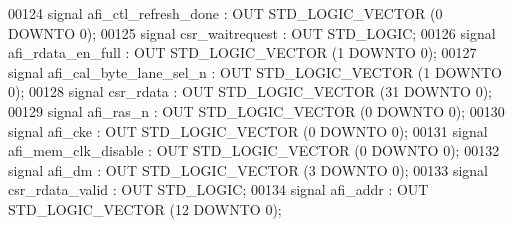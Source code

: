 \begin{DoxyCode}
00124         \textcolor{keywordflow}{signal} afi\_ctl\_refresh\_done : \textcolor{keywordflow}{OUT} \textcolor{comment}{STD\_LOGIC\_VECTOR} (\textcolor{vhdllogic}{}\textcolor{vhdllogic}{0} \textcolor{keywordflow}{DOWNTO} \textcolor{vhdllogic}{}\textcolor{vhdllogic}{0});
00125         \textcolor{keywordflow}{signal} csr\_waitrequest : \textcolor{keywordflow}{OUT} \textcolor{comment}{STD\_LOGIC};
00126         \textcolor{keywordflow}{signal} afi\_rdata\_en\_full : \textcolor{keywordflow}{OUT} \textcolor{comment}{STD\_LOGIC\_VECTOR} (\textcolor{vhdllogic}{}\textcolor{vhdllogic}{1} \textcolor{keywordflow}{DOWNTO} \textcolor{vhdllogic}{}\textcolor{vhdllogic}{0});
00127         \textcolor{keywordflow}{signal} afi\_cal\_byte\_lane\_sel\_n : \textcolor{keywordflow}{OUT} \textcolor{comment}{STD\_LOGIC\_VECTOR} (\textcolor{vhdllogic}{}\textcolor{vhdllogic}{1} \textcolor{keywordflow}{DOWNTO} \textcolor{vhdllogic}{}\textcolor{vhdllogic}{0});
00128         \textcolor{keywordflow}{signal} csr\_rdata : \textcolor{keywordflow}{OUT} \textcolor{comment}{STD\_LOGIC\_VECTOR} (\textcolor{vhdllogic}{}\textcolor{vhdllogic}{31} \textcolor{keywordflow}{DOWNTO} \textcolor{vhdllogic}{}\textcolor{vhdllogic}{0});
00129         \textcolor{keywordflow}{signal} afi\_ras\_n : \textcolor{keywordflow}{OUT} \textcolor{comment}{STD\_LOGIC\_VECTOR} (\textcolor{vhdllogic}{}\textcolor{vhdllogic}{0} \textcolor{keywordflow}{DOWNTO} \textcolor{vhdllogic}{}\textcolor{vhdllogic}{0});
00130         \textcolor{keywordflow}{signal} afi\_cke : \textcolor{keywordflow}{OUT} \textcolor{comment}{STD\_LOGIC\_VECTOR} (\textcolor{vhdllogic}{}\textcolor{vhdllogic}{0} \textcolor{keywordflow}{DOWNTO} \textcolor{vhdllogic}{}\textcolor{vhdllogic}{0});
00131         \textcolor{keywordflow}{signal} afi\_mem\_clk\_disable : \textcolor{keywordflow}{OUT} \textcolor{comment}{STD\_LOGIC\_VECTOR} (\textcolor{vhdllogic}{}\textcolor{vhdllogic}{0} \textcolor{keywordflow}{DOWNTO} \textcolor{vhdllogic}{}\textcolor{vhdllogic}{0});
00132         \textcolor{keywordflow}{signal} afi\_dm : \textcolor{keywordflow}{OUT} \textcolor{comment}{STD\_LOGIC\_VECTOR} (\textcolor{vhdllogic}{}\textcolor{vhdllogic}{3} \textcolor{keywordflow}{DOWNTO} \textcolor{vhdllogic}{}\textcolor{vhdllogic}{0});
00133         \textcolor{keywordflow}{signal} csr\_rdata\_valid : \textcolor{keywordflow}{OUT} \textcolor{comment}{STD\_LOGIC};
00134         \textcolor{keywordflow}{signal} afi\_addr : \textcolor{keywordflow}{OUT} \textcolor{comment}{STD\_LOGIC\_VECTOR} (\textcolor{vhdllogic}{}\textcolor{vhdllogic}{12} \textcolor{keywordflow}{DOWNTO} \textcolor{vhdllogic}{}\textcolor{vhdllogic}{0});

\end{DoxyCode}
